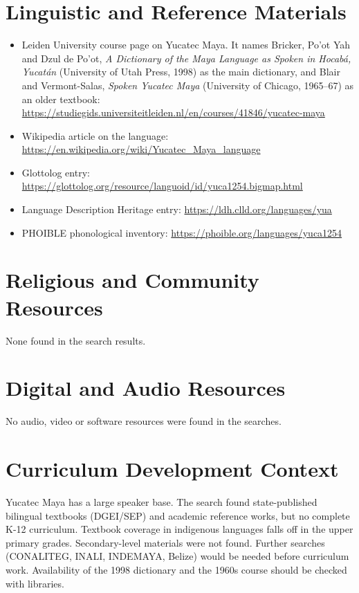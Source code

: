 \documentclass[12pt]{article}
\begin{document}
\section{Linguistic and Reference Materials}
\begin{itemize}
\item Leiden University course page on Yucatec Maya. It names Bricker, Po'ot Yah and Dzul de Po'ot, \emph{A Dictionary of the Maya Language as Spoken in Hocab\'a, Yucat\'an} (University of Utah Press, 1998) as the main dictionary, and Blair and Vermont-Salas, \emph{Spoken Yucatec Maya} (University of Chicago, 1965--67) as an older textbook: \url{https://studiegids.universiteitleiden.nl/en/courses/41846/yucatec-maya}
\item Wikipedia article on the language: \url{https://en.wikipedia.org/wiki/Yucatec_Maya_language}
\item Glottolog entry: \url{https://glottolog.org/resource/languoid/id/yuca1254.bigmap.html}
\item Language Description Heritage entry: \url{https://ldh.clld.org/languages/yua}
\item PHOIBLE phonological inventory: \url{https://phoible.org/languages/yuca1254}
\end{itemize}

\section{Religious and Community Resources}
None found in the search results.

\section{Digital and Audio Resources}
No audio, video or software resources were found in the searches.

\section{Curriculum Development Context}
Yucatec Maya has a large speaker base. The search found state-published bilingual textbooks (DGEI/SEP) and academic reference works, but no complete K-12 curriculum. Textbook coverage in indigenous languages falls off in the upper primary grades. Secondary-level materials were not found. Further searches (CONALITEG, INALI, INDEMAYA, Belize) would be needed before curriculum work. Availability of the 1998 dictionary and the 1960s course should be checked with libraries.
\end{document}
